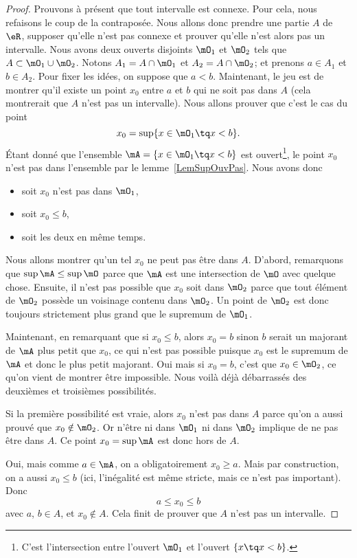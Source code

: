 \begin{proof}
	Prouvons à présent que tout intervalle est connexe. Pour cela, nous refaisons le coup de la contraposée. Nous allons donc prendre une partie \( A\) de \( \eR\), supposer qu'elle n'est pas connexe et prouver qu'elle n'est alors pas un intervalle. Nous avons deux ouverts disjoints \( \mO_1\) et \( \mO_2\) tels que \( A\subset \mO_1\cup \mO_2\). Notons \( A_1 = A \cap \mO_1 \) et \( A_2 = A \cap \mO_2 \); et prenons \( a\in A_1\) et \( b\in A_2\). Pour fixer les idées, on suppose que \( a<b\). Maintenant, le jeu est de montrer qu'il existe un point \( x_0\) entre \( a\) et \( b\) qui ne soit pas dans \( A\) (cela montrerait que \( A\) n'est pas un intervalle). Nous allons prouver que c'est le cas du point
	\[
		x_0=\sup\{ x\in\mO_1\tq x<b \}.
	\]
	Étant donné que l'ensemble \( \mA=\{ x\in\mO_1\tq x<b \}\) est ouvert\footnote{C'est l'intersection entre l'ouvert \( \mO_1\) et l'ouvert \( \{x\tq x<b \}\).}, le point \( x_0\) n'est pas dans l'ensemble par le lemme~\ref{LemSupOuvPas}. Nous avons donc
	\begin{itemize}
		\item soit \( x_0\) n'est pas dans \( \mO_1\),
		\item soit \( x_0\leq b\),
		\item soit les deux en même temps.
	\end{itemize}
	Nous allons montrer qu'un tel \( x_0\) ne peut pas être dans \( A\). D'abord, remarquons que \( \sup\mA\leq\sup\mO\) parce que \( \mA\) est une intersection de \( \mO\) avec quelque chose. Ensuite, il n'est pas possible que \( x_0\) soit dans \( \mO_2\) parce que tout élément de \( \mO_2\) possède un voisinage contenu dans \( \mO_2\). Un point de \( \mO_2\) est donc toujours strictement plus grand que le supremum de \( \mO_1\).

	Maintenant, en remarquant que si \( x_0\leq b\), alors \( x_0=b\) sinon \( b\) serait un majorant de \( \mA\) plus petit que \( x_0\), ce qui n'est pas possible puisque \( x_0\) est le supremum de \( \mA\) et donc le plus petit majorant. Oui mais si \( x_0=b\), c'est que \( x_0\in\mO_2\), ce qu'on vient de montrer être impossible. Nous voilà déjà débarrassés des deuxièmes et troisièmes possibilités.

	Si la première possibilité est vraie, alors \( x_0\) n'est pas dans \( A\) parce qu'on a aussi prouvé que \( x_0\notin\mO_2\). Or n'être ni dans \( \mO_1\) ni dans \( \mO_2\) implique de ne pas être dans \( A\). Ce point \( x_0=\sup\mA\) est donc hors de \( A\).

	Oui, mais comme \( a\in\mA\), on a obligatoirement \( x_0\geq a\). Mais par construction, on a aussi \( x_0\leq b\) (ici, l'inégalité est même stricte, mais ce n'est pas important). Donc
	\[
		a\leq x_0\leq b
	\]
	avec \( a\), \( b\in A\), et \( x_0\notin A\). Cela finit de prouver que \( A\) n'est pas un intervalle.
\end{proof}

